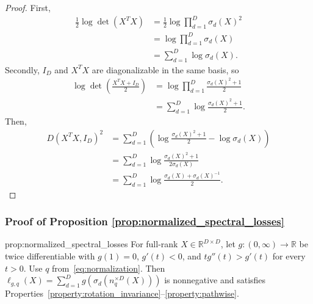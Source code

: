 \begin{proof}
First,
\begin{align}
\frac{1}{2}\log \det(X^T X) &= \frac{1}{2} \log \prod_{d=1}^D \sigma_d(X)^2 \\
&= \log \prod_{d=1}^D \sigma_d(X) \\
&= \sum_{d=1}^D \log \sigma_d(X).
\end{align}
Secondly, $I_D$ and $X^T X$ are diagonalizable in the same basis, so
\begin{align}
\log \det (\frac{X^T X + I_D}{2}) &= \log \prod_{d=1}^D \frac{\sigma_d(X)^2 + 1}{2} \\
&= \sum_{d=1}^D \log \frac{\sigma_d(X)^2 + 1}{2}.
\end{align}
Then,
\begin{align}
D(X^T X,I_D)^2
&= \sum_{d=1}^D (\log \frac{\sigma_d(X)^2 + 1}{2} - \log \sigma_d(X)) \\
&= \sum_{d=1}^D \log \frac{\sigma_d(X)^2 + 1}{2 \sigma_d(X)} \\
&= \sum_{d=1}^D \log \frac{\sigma_d(X) + \sigma_d(X)^{-1}}{2}.
\end{align}
\end{proof}

\subsubsection{Proof of Proposition \ref{prop:normalized_spectral_losses}}
\label{proof:normalized_spectral_losses}

\begin{restatedproposition}{prop:normalized_spectral_losses}
For full-rank $X\in\mathbb R^{D\times D}$, let $g:(0,\infty)\to\mathbb R$ be twice differentiable with $g(1)=0$, $g'(t)<0$, and $t g''(t)>g'(t)$ for every $t>0$.
Use $q$ from~\eqref{eq:normalization}.
Then $\ell_{g,q}(X)=\sum_{d=1}^D g\!\left(\sigma_d(n_q^{\times D}(X))\right)$ is nonnegative and satisfies Properties~\ref{property:rotation_invariance}--\ref{property:pathwise}.
\end{restatedproposition}

